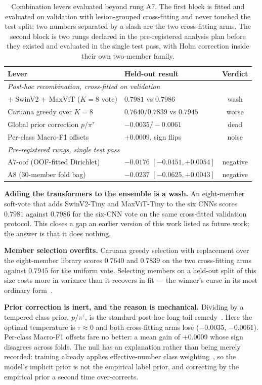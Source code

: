 \documentclass[journal]{IEEEtran}
\begin{document}
\begin{table}[t]
\centering
\caption{Combination levers evaluated beyond rung A7. The first block is fitted and evaluated
on validation with lesion-grouped cross-fitting and never touched the test split; two numbers
separated by a slash are the two cross-fitting arms. The second block is two rungs declared
in the pre-registered analysis plan before they existed and evaluated in the single test
pass, with Holm correction inside their own two-member family.}
\label{tab:exhaustion}
\begin{tabular}{llc}
\toprule
Lever & Held-out result & Verdict \\
\midrule
\multicolumn{3}{l}{\textit{Post-hoc recombination, cross-fitted on validation}} \\
$+$ SwinV2 $+$ MaxViT ($K{=}8$ vote) & $0.7981$ vs $0.7986$ & wash \\
Caruana greedy over $K{=}8$ & $0.7640/0.7839$ vs $0.7945$ & worse \\
Global prior correction $p/\pi^{\tau}$ & $-0.0035 / -0.0061$ & dead \\
Per-class Macro-F1 offsets & $+0.0009$, sign flips & noise \\
\midrule
\multicolumn{3}{l}{\textit{Pre-registered rungs, single test pass}} \\
A7-oof (OOF-fitted Dirichlet) & $-0.0176$ $[-0.0451, +0.0054]$ & negative \\
A8 ($30$-member fold bag) & $-0.0237$ $[-0.0625, +0.0043]$ & negative \\
\bottomrule
\end{tabular}
\end{table}

\textbf{Adding the transformers to the ensemble is a wash.} An eight-member soft-vote that
adds SwinV2-Tiny and MaxViT-Tiny to the six CNNs scores $0.7981$ against $0.7986$ for the
six-CNN vote on the same cross-fitted validation protocol. This closes a gap an earlier
version of this work listed as future work; the answer is that it does nothing.

\textbf{Member selection overfits.} Caruana greedy selection with replacement over the
eight-member library scores $0.7640$ and $0.7839$ on the two cross-fitting arms against
$0.7945$ for the uniform vote. Selecting members on a held-out split of this size costs more
in variance than it recovers in fit --- the winner's curse in its most ordinary
form~\cite{sculley2018winners}.

\textbf{Prior correction is inert, and the reason is mechanical.} Dividing by a tempered class
prior, $p/\pi^{\tau}$, is the standard post-hoc long-tail remedy~\cite{menon2021logitadjust,
saerens2002adjusting}. Here the optimal temperature is $\tau \approx 0$ and both cross-fitting
arms lose ($-0.0035$, $-0.0061$). Per-class Macro-F1 offsets fare no better: a mean gain of
$+0.0009$ whose sign disagrees across folds. The null has an explanation rather than being
merely recorded: training already applies effective-number class
weighting~\cite{cui2019classbalanced}, so the model's implicit prior is not the empirical
label prior, and correcting by the empirical prior a second time over-corrects.
\end{document}
